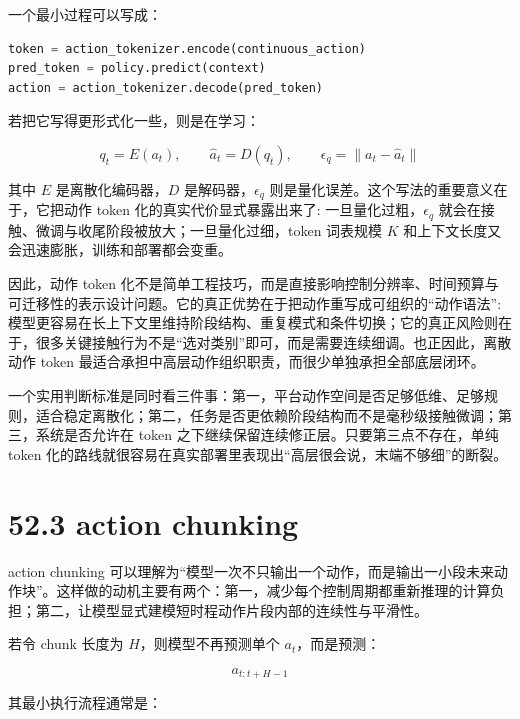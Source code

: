 一个最小过程可以写成：

\begin{lstlisting}[language=python]
token = action_tokenizer.encode(continuous_action)
pred_token = policy.predict(context)
action = action_tokenizer.decode(pred_token)
\end{lstlisting}

若把它写得更形式化一些，则是在学习：

\begingroup
\footnotesize
\begin{equation*}
q_t = E(a_t), \qquad \hat{a}_t = D(q_t), \qquad
\epsilon_q = \|a_t - \hat{a}_t\|
\end{equation*}
\endgroup

其中 \(E\) 是离散化编码器，\(D\) 是解码器，\(\epsilon_q\) 则是量化误差。这个写法的重要意义在于，它把动作 token 化的真实代价显式暴露出来了: 一旦量化过粗，\(\epsilon_q\) 就会在接触、微调与收尾阶段被放大；一旦量化过细，token 词表规模 \(K\) 和上下文长度又会迅速膨胀，训练和部署都会变重。

因此，动作 token 化不是简单工程技巧，而是直接影响控制分辨率、时间预算与可迁移性的表示设计问题。它的真正优势在于把动作重写成可组织的“动作语法”: 模型更容易在长上下文里维持阶段结构、重复模式和条件切换；它的真正风险则在于，很多关键接触行为不是“选对类别”即可，而是需要连续细调。也正因此，离散动作 token 最适合承担中高层动作组织职责，而很少单独承担全部底层闭环。

一个实用判断标准是同时看三件事：第一，平台动作空间是否足够低维、足够规则，适合稳定离散化；第二，任务是否更依赖阶段结构而不是毫秒级接触微调；第三，系统是否允许在 token 之下继续保留连续修正层。只要第三点不存在，单纯 token 化的路线就很容易在真实部署里表现出“高层很会说，末端不够细”的断裂。

\section*{52.3 action chunking}


action chunking 可以理解为“模型一次不只输出一个动作，而是输出一小段未来动作块”。这样做的动机主要有两个：第一，减少每个控制周期都重新推理的计算负担；第二，让模型显式建模短时程动作片段内部的连续性与平滑性。

若令 chunk 长度为 \(H\)，则模型不再预测单个 \(a_t\)，而是预测：

\begin{equation*}
a_{t:t+H-1}
\end{equation*}

其最小执行流程通常是：

